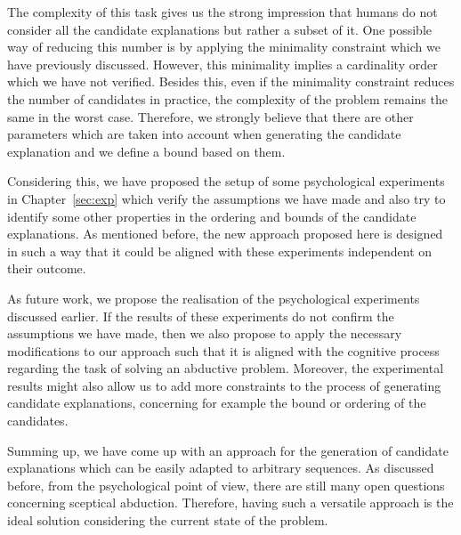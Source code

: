 The complexity of this task gives us the strong impression that humans do not consider all the candidate explanations but rather a subset of it. One possible way of reducing this number is by applying the minimality constraint which we have previously discussed. However, this minimality implies a cardinality order which we have not verified. Besides this, even if the minimality constraint reduces the number of candidates in practice, the complexity of the problem remains the same in the worst case. Therefore, we strongly believe that there are other parameters which are taken into account when generating the candidate explanation and we define a bound based on them.

Considering this, we have proposed the setup of some psychological experiments in Chapter~\ref{sec:exp} which verify the assumptions we have made and also try to identify some other properties in the ordering and bounds of the candidate explanations. As mentioned before, the new approach proposed here is designed in such a way that it could be aligned with these experiments independent on their outcome.

As future work, we propose the realisation of the psychological experiments discussed earlier. If the results of these experiments do not confirm the assumptions we have made, then we also propose to apply the necessary modifications to our approach such that it is aligned with the cognitive process regarding the task of solving an abductive problem. Moreover, the experimental results might also allow us to add more constraints to the process of generating candidate explanations, concerning for example the bound or ordering of the candidates.

Summing up, we have come up with an approach for the generation of candidate explanations which can be easily adapted to arbitrary sequences. As discussed before, from the psychological point of view, there are still many open questions concerning sceptical abduction. Therefore, having such a versatile approach is the ideal solution considering the current state of the problem.
